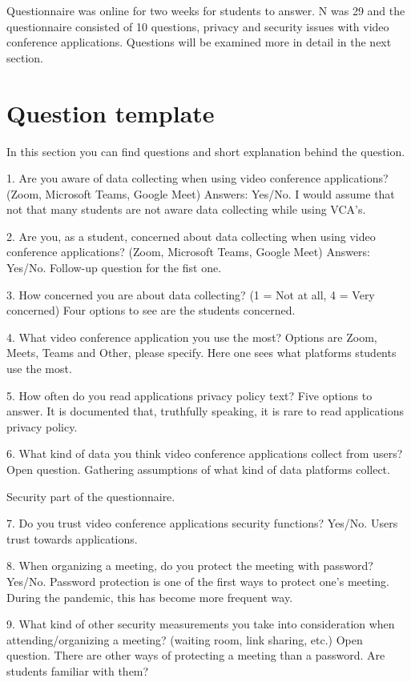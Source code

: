 \documentclass[utf8,english]{gradu3}
\begin{document}
Questionnaire was online for two weeks for students to answer. N was 29 and the questionnaire consisted of 10 questions, privacy and security issues with video conference applications. Questions will be examined more in detail in the next section.

\section{Question template}
In this section you can find questions and short explanation behind the question.

1. Are you aware of data collecting when using video conference applications? (Zoom, Microsoft Teams, Google Meet) Answers: Yes/No. I would assume that not that many students are not aware data collecting while using VCA's.

2. Are you, as a student, concerned about data collecting when using video conference applications? (Zoom, Microsoft Teams, Google Meet) Answers: Yes/No. Follow-up question for the fist one. 

3. How concerned you are about data collecting? (1 = Not at all, 4 = Very concerned) Four options to see are the students concerned.

4. What video conference application you use the most? Options are Zoom, Meets, Teams and Other, please specify. Here one sees what platforms students use the most. 

5. How often do you read applications privacy policy text? Five options to answer. It is documented that, truthfully speaking, it is rare to read applications privacy policy.

6. What kind of data you think video conference applications collect from users? Open question. Gathering assumptions of what kind of data platforms collect.

Security part of the questionnaire.

7. Do you trust video conference applications security functions? Yes/No. Users trust towards applications.

8. When organizing a meeting, do you protect the meeting with password? Yes/No. Password protection is one of the first ways to protect one's meeting. During the pandemic, this has become more frequent way.

9. What kind of other security measurements you take into consideration when attending/organizing a meeting? (waiting room, link sharing, etc.) Open question. There are other ways of protecting a meeting than a password. Are students familiar with them?
\end{document}
